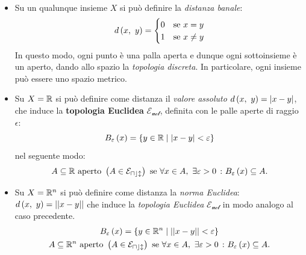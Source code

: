 \begin{examples}~{}
\begin{itemize}
	\item Su un qualunque insieme $X$ si può definire la \textit{distanza banale}:
	\begin{equation}
		d\left(x,\ y\right)=\begin{cases} 
			0 & \text{se }x=y\\
			1 & \text{se }x\neq y
		\end{cases}
	\end{equation}
	In questo modo, ogni punto è una palla aperta e dunque ogni sottoinsieme è un aperto, dando allo spazio la \textit{topologia discreta}. In particolare, ogni insieme può essere uno spazio metrico.
	\item Su $X=\mathbb{R}$ si può definire come distanza il \textit{valore assoluto} $d\left(x,\ y\right)=|x-y|$, che induce la \textbf{topologia Euclidea} $\mathcal{E_{ucl}}$, definita con le palle aperte di raggio $\epsilon$:
	\begin{equation}
		B_{\varepsilon}\left(x\right)=\left\{y\in \mathbb{R}\mid |x-y|<\varepsilon\right\}
	\end{equation}
	nel seguente modo:
	\begin{equation*}
		A\subseteq \mathbb{R} \text{ aperto } \left(A\in\mathcal{E_{ucl}}\right) \text{ se } \forall x\in A,\ \exists \varepsilon>0\ \colon B_{\varepsilon}\left(x\right)\subseteq A.
	\end{equation*}
	\item Su $X=\mathbb{R}^n$ si può definire come distanza la \textit{norma Euclidea}: $d\left(x,\ y\right)=||x-y||$ che induce la \textit{topologia Euclidea} $\mathcal{E_{ucl}}$ in modo analogo al caso precedente.
	\begin{gather*}
		B_{\varepsilon}\left(x\right)=\left\{y\in \mathbb{R}^n\mid ||x-y||<\varepsilon\right\}\\
		A\subseteq \mathbb{R}^n \text{ aperto } \left(A\in\mathcal{E_{ucl}}\right) \text{ se } \forall x\in A,\ \exists \varepsilon>0\ \colon B_{\varepsilon}\left(x\right)\subseteq A.
	\end{gather*}
\end{itemize}
\end{examples}
